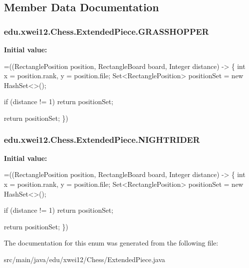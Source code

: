 \subsection{Member Data Documentation}
\subsubsection[{\texorpdfstring{G\+R\+A\+S\+S\+H\+O\+P\+P\+ER}{GRASSHOPPER}}]{\setlength{\rightskip}{0pt plus 5cm}edu.\+xwei12.\+Chess.\+Extended\+Piece.\+G\+R\+A\+S\+S\+H\+O\+P\+P\+ER}\hypertarget{enumedu_1_1xwei12_1_1_chess_1_1_extended_piece_a1a2be68ffbc9616b395761b82aa5ac18}{}\label{enumedu_1_1xwei12_1_1_chess_1_1_extended_piece_a1a2be68ffbc9616b395761b82aa5ac18}
{\bfseries Initial value\+:}
\begin{DoxyCode}
=((RectanglePosition position, RectangleBoard board, Integer distance) -> \{
        \textcolor{keywordtype}{int} x = position.rank, y = position.file;
        Set<RectanglePosition> positionSet = \textcolor{keyword}{new} HashSet<>();

        
        \textcolor{keywordflow}{if} (distance != 1) \textcolor{keywordflow}{return} positionSet;

        

        \textcolor{keywordflow}{return} positionSet;
    \})
\end{DoxyCode}
\subsubsection[{\texorpdfstring{N\+I\+G\+H\+T\+R\+I\+D\+ER}{NIGHTRIDER}}]{\setlength{\rightskip}{0pt plus 5cm}edu.\+xwei12.\+Chess.\+Extended\+Piece.\+N\+I\+G\+H\+T\+R\+I\+D\+ER}\hypertarget{enumedu_1_1xwei12_1_1_chess_1_1_extended_piece_acb765406bb6cfe1bbdf7c8d153216f11}{}\label{enumedu_1_1xwei12_1_1_chess_1_1_extended_piece_acb765406bb6cfe1bbdf7c8d153216f11}
{\bfseries Initial value\+:}
\begin{DoxyCode}
=((RectanglePosition position, RectangleBoard board, Integer distance) -> \{
        \textcolor{keywordtype}{int} x = position.rank, y = position.file;
        Set<RectanglePosition> positionSet = \textcolor{keyword}{new} HashSet<>();

        
        \textcolor{keywordflow}{if} (distance != 1) \textcolor{keywordflow}{return} positionSet;

        

        \textcolor{keywordflow}{return} positionSet;
    \})
\end{DoxyCode}


The documentation for this enum was generated from the following file\+:\begin{DoxyCompactItemize}
\item 
src/main/java/edu/xwei12/\+Chess/Extended\+Piece.\+java\end{DoxyCompactItemize}
